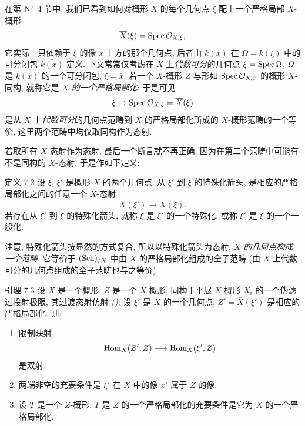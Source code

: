 在第 ${\rm N^{\circ}}$ 4 节中,
我们已看到如何对概形 $X$ 的每个几何点 $\xi$ 配上一个严格局部 $X$-概形
$$
\overline{X}(\xi) = \operatorname{Spec} {\mathcal O}_{X, \xi}{},
$$
它实际上只依赖于 $\xi$ 的像 $x$ 上方的那个几何点,
后者由 $k(x)$ 在 $\Omega = k(\xi)$ 中的可分闭包 $\bar{k(x)}$ 定义.
下文常常仅考虑在 $X$ 上\emph{代数可分}的几何点 $\xi = \operatorname{Spec} \Omega$,
\ie $\Omega$ 是 $k(x)$ 的一个可分闭包, \ie $\xi = \bar{x}$.
若一个 $X$-概形 $Z$ 与形如 $\operatorname{Spec} {\mathcal O}_{X, \overline{x}}$ 的概形 $X$-同构,
就称它是 \emph{$X$ 的一个严格局部化}; 于是可见
$$
\xi \mapsto \operatorname{Spec} \protect\mathcal{{\mathcal O}}_{X, \xi} = \overline{X}(\xi)
$$
是从 $X$ 上\emph{代数可分}的几何点范畴到 $X$ 的严格局部化所成的
$X$-概形范畴的一个等价,
这里两个范畴中均仅取同构作为态射.

若取所有 $X$-态射作为态射, 最后一个断言就不再正确,
因为在第二个范畴中可能有不是同构的 $X$-态射.
于是作如下定义:

\begin{enonce*}{定义 7.2}
设 $\xi$, $\xi'$ 是概形 $X$ 的两个几何点.
从 $\xi'$ 到 $\xi$ 的特殊化箭头,
是相应的严格局部化之间的任意一个 $X$-态射
$$
\bar{X} (\xi') \to \bar{X} (\xi).
$$
若存在从 $\xi'$ 到 $\xi$ 的特殊化箭头,
就\pageoriginale 称 $\xi$ 是 $\xi'$ 的一个特殊化,
或称 $\xi'$ 是 $\xi$ 的一个一般化.
\end{enonce*}

注意, 特殊化箭头按显然的方式复合,
所以以特殊化箭头为态射, \emph{$X$ 的几何点构成一个范畴},
它等价于 $(\operatorname{Sch})_{/X}$ 中由 $X$ 的严格局部化组成的全子范畴
(由 $X$ 上代数可分的几何点组成的全子范畴也与之等价).

\begin{enonce*}{引理 7.3}
设 $X$ 是一个概形, $Z$ 是一个 $X$-概形,
同构于平展 $X$-概形 $X_{i}$ 的一个伪滤过投射极限,
其过渡态射仿射 \emph{()};
设 $\xi'$ 是 $X$ 的一个几何点,
$Z' = \bar{X} (\xi')$ 是相应的严格局部化. 则:
\begin{enumerate}
\renewcommand{\theenumi}{\alph{enumi}}
\renewcommand{\labelenumi}{\theenumi)}
\item 限制映射
$$
\Hom_X (Z', Z) \to \Hom_X(\xi', Z)
$$
是双射.

\item 两端非空的充要条件是 $\xi'$ 在 $X$ 中的像 $x'$ 属于 $Z$ 的像.

\item 设 $T$ 是一个 $Z$-概形.
$T$ 是 $Z$ 的一个严格局部化的充要条件是它为 $X$ 的一个严格局部化.
\end{enumerate}
\end{enonce*}

